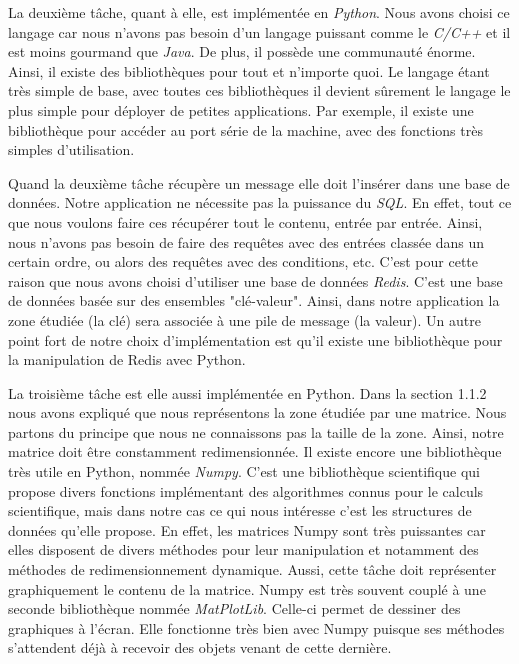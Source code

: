 \documentclass[a4paper,10pt]{report}
\begin{document}
	La deuxième tâche, quant à elle, est implémentée en 
\textit{Python}\cite{python}. Nous avons choisi ce langage car nous n'avons pas 
besoin d'un langage puissant comme le \textit{C/C++} et il est moins gourmand 
que \textit{Java}. De plus, il possède une communauté énorme. Ainsi, il existe 
des bibliothèques pour tout et n'importe quoi. Le langage étant très simple de 
base, avec toutes ces bibliothèques il devient sûrement le langage le plus 
simple pour déployer de petites applications. Par exemple, il existe une 
bibliothèque pour accéder au port série de la machine, avec des fonctions très 
simples d'utilisation.

	Quand la deuxième tâche récupère un message elle doit l'insérer dans 
une base de données. Notre application ne nécessite pas la puissance du 
\textit{SQL}. En effet, tout ce que nous voulons faire ces récupérer tout le 
contenu, entrée par entrée. Ainsi, nous n'avons pas besoin de faire des 
requêtes avec des entrées classée dans un certain ordre, ou alors des requêtes 
avec des conditions, etc. C'est pour cette raison que nous avons choisi 
d'utiliser une base de données \textit{Redis}\cite{redis}. C'est une base de 
données basée sur des ensembles "clé-valeur". Ainsi, dans notre application la 
zone étudiée (la clé) sera associée à une pile de message (la valeur). Un autre 
point fort de notre choix d'implémentation est qu'il existe une bibliothèque 
pour la manipulation de Redis avec Python. 

      La troisième tâche est elle aussi implémentée en Python. Dans la section 
1.1.2 nous avons expliqué que nous représentons la zone étudiée par une 
matrice. Nous partons du principe que nous ne connaissons pas la taille de la 
zone. Ainsi, notre matrice doit être constamment redimensionnée. Il existe 
encore une bibliothèque très utile en Python, nommée 
\textit{Numpy}\cite{numpy}. C'est une bibliothèque scientifique qui propose 
divers fonctions implémentant des algorithmes connus pour le calculs 
scientifique, mais dans notre cas ce qui nous intéresse c'est les structures de 
données qu'elle propose. En effet, les matrices Numpy sont très puissantes car 
elles disposent de divers méthodes pour leur manipulation et notamment des 
méthodes de redimensionnement dynamique.
      Aussi, cette tâche doit représenter graphiquement le contenu de la 
matrice. Numpy est très souvent couplé à une seconde bibliothèque nommée 
\textit{MatPlotLib}\cite{matplotlib}. Celle-ci permet de dessiner des 
graphiques à l'écran. Elle fonctionne très bien avec Numpy puisque ses méthodes 
s'attendent déjà à recevoir des objets venant de cette dernière.
\end{document}

